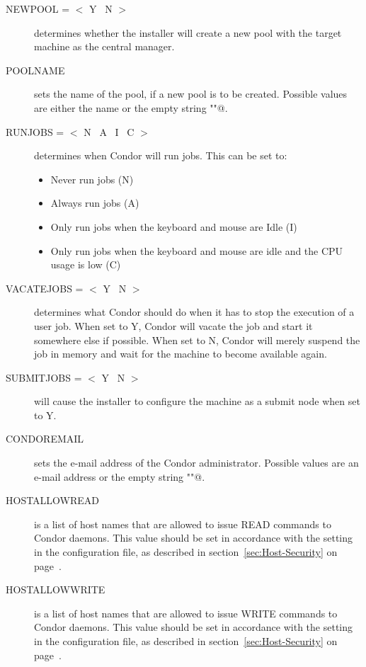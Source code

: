 \begin{description}
\item [NEWPOOL = $<$ Y \Bar\ N $>$]
determines whether the installer will create a new pool with the target
machine as the central manager.

\item [POOLNAME]
sets the name of the pool, if a new pool is to be created. Possible values
are either the name or the empty string \verb@""@.

\item [RUNJOBS = $<$ N \Bar\ A \Bar\ I \Bar\ C $>$]
determines when Condor will run jobs. This can be set to:
\begin{itemize}
\item Never run jobs (N)
\item Always run jobs (A)
\item Only run jobs when the keyboard and mouse are Idle (I)
\item Only run jobs when the keyboard and mouse are idle and the CPU
usage is low (C)
\end{itemize}

\item [VACATEJOBS = $<$ Y \Bar\ N $>$]
determines what Condor should do when it has to stop the execution of
a user job. When set to Y, Condor will vacate the job and start
it somewhere else if possible. When set to N, Condor will merely
suspend the job in memory and wait for the machine to become available
again. 

\item[SUBMITJOBS  = $<$ Y \Bar\ N $>$]
will cause the installer to configure the machine as a submit
node when set to Y. 

\item[CONDOREMAIL]
sets the e-mail address of the Condor administrator. Possible values are
an e-mail address or the empty string \verb@""@.

\item[HOSTALLOWREAD]
is a list of host names that are allowed to issue READ commands to
Condor daemons. This value should be set in accordance with the
 setting in the configuration file, as described in
section~\ref{sec:Host-Security} on page~\pageref{sec:Host-Security}.

\item[HOSTALLOWWRITE]
is a list of host names that are allowed to issue WRITE commands to
Condor daemons. This value should be set in accordance with the
 setting in the configuration file, as described in
section~\ref{sec:Host-Security} on page~\pageref{sec:Host-Security}.


\end{description}
